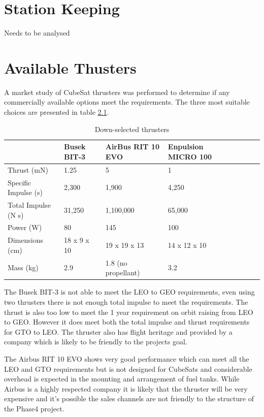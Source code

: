 \documentclass[a4paper, article, oneside, UKenglish]{memoir}
\newcommand{\0}{\mathbf{0}}
\newcommand{\1}{\mathbf{1}}
\begin{document}
\chapter{Station Keeping}

Needs to be analysed


\chapter{Available Thusters}

A market study of CubeSat thrusters was performed to determine if any commercially available options meet the requirements.  The three most suitable choices are presented in table \ref{tab:available_thrusters}.

\begin{table}[h]
\centering
\begin{tabular}{@{}llllllll@{}}
\toprule
						& Busek BIT-3	& AirBus RIT 10 EVO		& Enpulsion MICRO 100	\\ \midrule 
Thrust (mN)				& 1.25			& 5						& 1						\\
Specific Impulse (s) 	& 2,300			& 1,900					& 4,250					\\
Total Impulse (N s)		& 31,250		& 1,100,000				& 65,000				\\
Power (W)				& 80			& 145					& 100					\\
Dimensions (cm)			& 18 x 9 x 10	& 19 x 19 x 13			& 14 x 12 x 10			\\
Mass (kg) 				& 2.9			& 1.8 (no propellant)	& 3.2					\\ \bottomrule
\end{tabular}
\captionsetup{justification=centering}
\caption{Down-selected thrusters}
\label{tab:available_thrusters}
\end{table}

The Busek BIT-3 is not able to meet the LEO to GEO requirements, even using two thrusters there is not enough total impulse to meet the requirements.  The thrust is also too low to meet the 1 year requirement on orbit raising from LEO to GEO.  However it does meet both the total impulse and thrust requirements for GTO to LEO.  The thruster also has flight heritage and provided by a company which is likely to be friendly to the projects goal.

The Airbus RIT 10 EVO shows very good performance which can meet all the LEO and GTO requirements but is not designed for CubeSats and considerable overhead is expected in the mounting and arrangement of fuel tanks.  While Airbus is a highly respected company it is likely that the thruster will be very expensive and it's possible the sales channels are not friendly to the structure of the Phase4 project.
\end{document}
